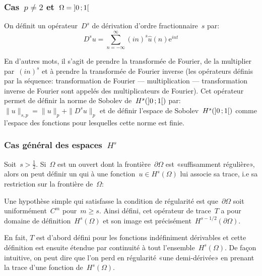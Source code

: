 \medskip
\subsubsection{Cas~$p\neq 2$ et~$\Omega = \mathopen{]}0\,;1\mathclose{[}$}

On définit un opérateur~$D^s$ de dérivation d'ordre fractionnaire~$s$ par:
\begin{equation}
D^{s}u=\sum_{n=-\infty}^\infty (in)^s\widehat{u}(n)\mathrm{e}^{int}
\end{equation}

En d'autres mots, il s'agit de prendre la transformée de Fourier, de la multiplier par~$(in)^s$ et à prendre la transformée de Fourier inverse (les opérateurs définis par la séquence: transformation de Fourier --- multiplication --- transformation inverse de Fourier sont appelés des multiplicateurs de Fourier).
Cet opérateur permet de définir la norme de Sobolev de~$H^s(\mathopen{]}0\,;1\mathclose{[})$ par: 
$\|u\|_{s,p}=\|u\|_p+\|D^s u\|_p$ et de définir l'espace de Sobolev~$H^s(\mathopen{]}0\,;1\mathclose{[})$
comme l'espace des fonctions pour lesquelles cette norme est finie.

\medskip
\subsubsection{Cas général des espaces~$H^s$}

Soit~$s > \frac{1}{2}$. Si~$\Omega$ est un ouvert dont la frontière~$\partial \Omega$ est «suffisamment régulière», alors on peut définir un  qui à une fonction~$u \in H^{s}(\Omega)$ lui associe sa trace, i.e sa restriction sur la frontière de~$\Omega$: 

Une hypothèse simple qui satisfasse la condition de régularité est que~$\partial \Omega$ soit uniformément~$C^m$ pour~$m \geqslant s$.
Ainsi défini, cet opérateur de trace~$T$ a pour domaine de définition~$H^s(\Omega)$ et son image est précisément~$H^{s-1/2}(\partial \Omega)$.

En fait, $T$ est d'abord défini pour les fonctions indéfiniment dérivables et cette définition est ensuite étendue par continuité à tout l'ensemble~$H^s(\Omega)$.
De façon intuitive, on peut dire que l'on perd en régularité «une demi-dérivée» en prenant la trace d'une fonction de~$H^s(\Omega)$.


